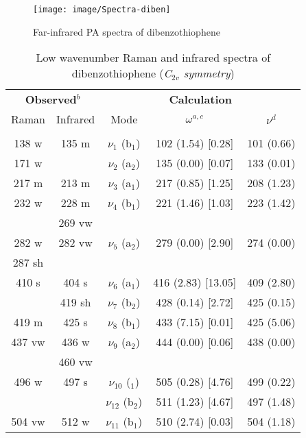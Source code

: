 	
	\begin{figure}[H]
		\centering
		\texttt{[image: image/Spectra-diben]}  \label{P1-spectradiben}
		\caption{Far-infrared PA spectra of dibenzothiophene}
	\end{figure}
	
	
	
	\begin{table}[H]
		\begin{center}
			\caption[Low wavenumber Raman and infrared spectra of dibenzothiophene]{Low wavenumber Raman and infrared spectra of dibenzothiophene (\textit{C$_{2v}$ symmetry})}
			\begin{threeparttable}[b]
				\begin{tabular}{c c c c c}
					\toprule
					\multicolumn{2}{p{5cm}}{\centering \textbf{Observed$^{b}$}} & \multicolumn{3}{p{10cm}}{\centering \textbf{Calculation}} \\
					Raman & Infrared & Mode & $\omega^{a,c}$ & $\nu^{d}$ \\
					\midrule
					&  &   &    &   \\
					138 w & 135 m & $\nu_{1}$ (b$_{1}$) & 102 (1.54) [0.28] & 101 (0.66) \\
					171 w &  & $\nu_{2}$ (a$_{2}$) & 135 (0.00) [0.07] & 133 (0.01)\\
					217 m & 213 m & $\nu_{3}$ (a$_{1}$) & 217 (0.85) [1.25] & 208 (1.23) \\
					232 w & 228 m & $\nu_{4}$ (b$_{1}$) & 221 (1.46) [1.03] & 223 (1.42) \\
					& 269 vw &  &  &  \\
					282 w & 282 vw & $\nu_{5}$ (a$_{2}$) & 279 (0.00) [2.90] & 274 (0.00)\\
					287 sh & &  &  & \\
					410 s & 404 s & $\nu_{6}$ (a$_{1}$) & 416 (2.83) [13.05] & 409 (2.80)\\
					& 419 sh & $\nu_{7}$ (b$_{2}$) & 428 (0.14) [2.72] & 425 (0.15) \\
					419 m & 425 s & $\nu_{8}$ (b$_{1}$) & 433 (7.15) [0.01] & 425 (5.06) \\
					437 vw & 436 w & $\nu_{9}$ (a$_{2}$) & 444 (0.00) [0.06] & 438 (0.00) \\
					& 460 vw  &  &   & \\
					496 w & 497 s & $\nu_{10}$ ($_{1}$) & 505 (0.28) [4.76] & 499 (0.22) \\
					&  & $\nu_{12}$ (b$_{2}$) & 511 (1.23) [4.67] & 497 (1.48)\\
					504 vw & 512 w & $\nu_{11}$ (b$_{1}$) & 510 (2.74) [0.03] & 504 (1.18) \\

\end{tabular}
\end{threeparttable}
\end{center}
\end{table}
